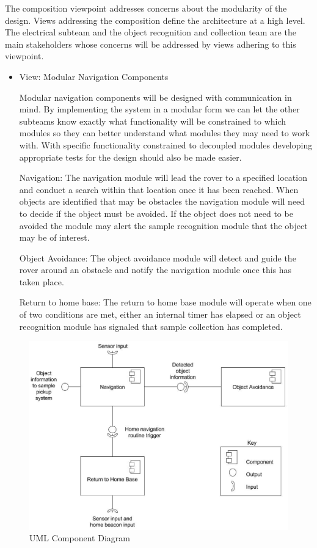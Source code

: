 \documentclass[10pt, oneside,onecolumn]{IEEEtran}
\begin{document}
\begin{titlepage}
The composition viewpoint addresses concerns about the modularity of the design. Views addressing the composition define the architecture at a high level. The electrical subteam and the object recognition and collection team are the main stakeholders whose concerns will be addressed by views adhering to this viewpoint. 

\begin{itemize}

\item View: Modular Navigation Components

Modular navigation components will be designed with communication in mind. By implementing the system in a modular form we can let the other subteams know exactly what functionality will be constrained to which modules so they can better understand what modules they may need to work with. With specific functionality constrained to decoupled modules developing appropriate tests for the design should also be made easier.

\subitem Navigation: The navigation module will lead the rover to a specified location and conduct a search within that location once it has been reached. When objects are identified that may be obstacles the navigation module will need to decide if the object must be avoided. If the object does not need to be avoided the module may alert the sample recognition module that the object may be of interest.

\subitem Object Avoidance: The object avoidance module will detect and guide the rover around an obstacle and notify the navigation module once this has taken place. 

\subitem Return to home base: The return to home base module will operate when one of two conditions are met, either an internal timer has elapsed or an object recognition module has signaled that sample collection has completed.

\end{itemize}

\begin{figure}[H]
\centering
\includegraphics[width=160mm]{drawing.eps}
\caption{UML Component Diagram}
\end{figure}


\end{titlepage}
\end{document}
